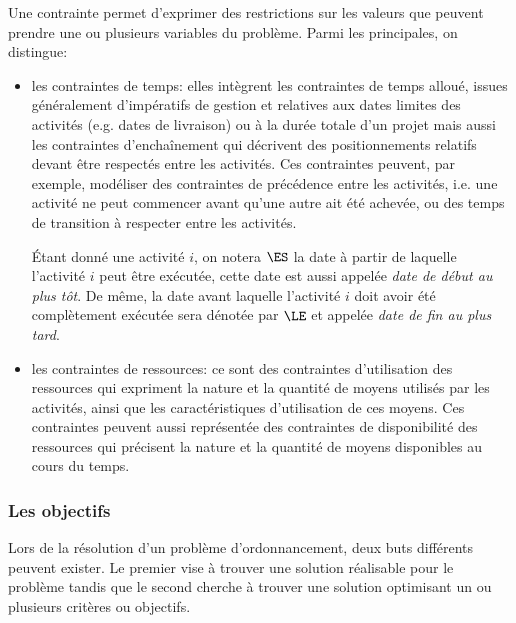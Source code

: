 Une contrainte permet d'exprimer des restrictions sur les valeurs que
peuvent prendre une ou plusieurs variables du problème. Parmi les
principales, on distingue:
\begin{itemize}
\item les contraintes de temps: elles intègrent les contraintes de
  temps alloué, issues généralement d'impératifs de gestion et
  relatives aux dates limites des activités (e.g. dates
    de livraison) ou à la durée totale d'un projet mais aussi les
    contraintes d'enchaînement qui décrivent des
    positionnements relatifs devant être respectés entre les
    activités. Ces contraintes peuvent, par exemple, modéliser des
    contraintes de précédence entre les activités, i.e. une activité
    ne peut commencer avant qu'une autre ait été achevée, ou des temps
    de transition à respecter entre les activités.

    {\'E}tant donné une activité $i$, on notera $\ES$ la date à partir
de laquelle l'activité $i$ peut être exécutée, cette date est aussi
appelée {\it date de début au plus tôt}. De même, la date avant
laquelle l'activité $i$ doit avoir été complètement exécutée sera
dénotée par $\LE$ et appelée {\it date de fin au plus tard}.

\item les contraintes de ressources:  ce sont des contraintes d'utilisation
  des ressources qui expriment la nature et la quantité de moyens
  utilisés par les activités, ainsi que les caractéristiques
  d'utilisation de ces moyens. Ces contraintes peuvent aussi représentée
  des contraintes de disponibilité des ressources qui précisent la
  nature et la quantité de moyens disponibles au cours du temps.
\end{itemize}

\subsubsection{Les objectifs}

Lors de la résolution d'un problème d'ordonnancement, deux buts
différents peuvent exister. Le premier vise à trouver une solution
réalisable pour le problème tandis que le second cherche à trouver une
solution optimisant un ou plusieurs critères ou objectifs.

